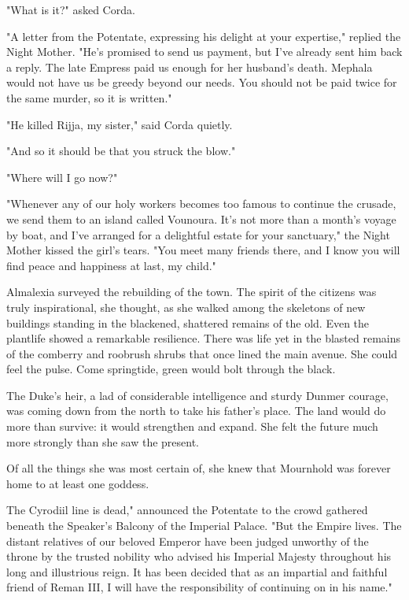 "What is it?" asked Corda.

"A letter from the Potentate, expressing his delight at your expertise," replied the Night Mother. "He's promised to send us payment, but I've already sent him back a reply. The late Empress paid us enough for her husband's death. Mephala would not have us be greedy beyond our needs. You should not be paid twice for the same murder, so it is written."

"He killed Rijja, my sister," said Corda quietly.

"And so it should be that you struck the blow."

"Where will I go now?"

"Whenever any of our holy workers becomes too famous to continue the crusade, we send them to an island called Vounoura. It's not more than a month's voyage by boat, and I've arranged for a delightful estate for your sanctuary," the Night Mother kissed the girl's tears. "You meet many friends there, and I know you will find peace and happiness at last, my child."

Almalexia surveyed the rebuilding of the town. The spirit of the citizens was truly inspirational, she thought, as she walked among the skeletons of new buildings standing in the blackened, shattered remains of the old. Even the plantlife showed a remarkable resilience. There was life yet in the blasted remains of the comberry and roobrush shrubs that once lined the main avenue. She could feel the pulse. Come springtide, green would bolt through the black.

The Duke's heir, a lad of considerable intelligence and sturdy Dunmer courage, was coming down from the north to take his father's place. The land would do more than survive: it would strengthen and expand. She felt the future much more strongly than she saw the present.

Of all the things she was most certain of, she knew that Mournhold was forever home to at least one goddess.

The Cyrodiil line is dead," announced the Potentate to the crowd gathered beneath the Speaker's Balcony of the Imperial Palace. "But the Empire lives. The distant relatives of our beloved Emperor have been judged unworthy of the throne by the trusted nobility who advised his Imperial Majesty throughout his long and illustrious reign. It has been decided that as an impartial and faithful friend of Reman III, I will have the responsibility of continuing on in his name."


